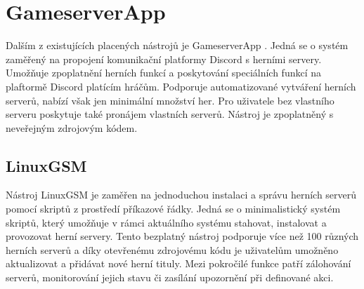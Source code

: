 \section{GameserverApp}

Dalším z existujících placených nástrojů je GameserverApp \cite{gameserverapp}. Jedná se o systém zaměřený na propojení komunikační platformy Discord s herními servery.
Umožňuje zpoplatnění herních funkcí a poskytování speciálních funkcí na plaftormě Discord platícím hráčům. Podporuje automatizované vytváření herních serverů, nabízí však jen
minimální množství her. Pro uživatele bez vlastního serveru poskytuje také pronájem vlastních serverů. Nástroj je zpoplatněný s neveřejným zdrojovým kódem.

\subsection{LinuxGSM}

Nástroj LinuxGSM \cite{linuxgsm} je zaměřen na jednoduchou instalaci a správu herních serverů pomocí skriptů z prostředí příkazové řádky.
Jedná se o minimalistický systém skriptů, který umožňuje v rámci aktuálního systému stahovat, instalovat a provozovat herní servery.
Tento bezplatný nástroj podporuje více než 100 různých herních serverů a díky otevřenému zdrojovému kódu je uživatelům umožněno aktualizovat
a přidávat nové herní tituly. Mezi pokročilé funkce patří zálohování serverů, monitorování jejich stavu či zasílání upozornění při definované akci.
